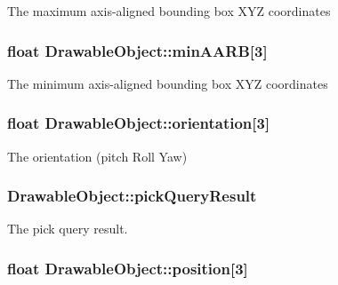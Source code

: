 The maximum axis-\/aligned bounding box X\-Y\-Z coordinates \hypertarget{class_drawable_object_a9f5690cffbebb0697e02f5676b43e881}{
\subsubsection[{min\-A\-A\-R\-B}]{\setlength{\rightskip}{0pt plus 5cm}float {\bf Drawable\-Object\-::min\-A\-A\-R\-B}\mbox{[}3\mbox{]}}}\label{class_drawable_object_a9f5690cffbebb0697e02f5676b43e881}
The minimum axis-\/aligned bounding box X\-Y\-Z coordinates \hypertarget{class_drawable_object_a4ade91da08f574dfb3776ca18d69f4f3}{
\subsubsection[{orientation}]{\setlength{\rightskip}{0pt plus 5cm}float {\bf Drawable\-Object\-::orientation}\mbox{[}3\mbox{]}}}\label{class_drawable_object_a4ade91da08f574dfb3776ca18d69f4f3}
The orientation (pitch Roll Yaw) \hypertarget{class_drawable_object_a642edc6bff786dcfc46de84baabce189}{
\subsubsection[{pick\-Query\-Result}]{ {\bf Drawable\-Object\-::pick\-Query\-Result}}}\label{class_drawable_object_a642edc6bff786dcfc46de84baabce189}
The pick query result. \hypertarget{class_drawable_object_a1be8afe81c6c559f63c6ed01cdbcac45}{
\subsubsection[{position}]{\setlength{\rightskip}{0pt plus 5cm}float {\bf Drawable\-Object\-::position}\mbox{[}3\mbox{]}}}\label{class_drawable_object_a1be8afe81c6c559f63c6ed01cdbcac45}
